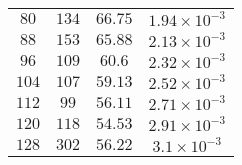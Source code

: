 \begin{center}
\begin{table}
\begin{center}
\begin{tabular}{c | c | c | c }
		$80$ & $134$ & $66.75$ & $1.94\times 10^{-3}$ \\ 
		$88$ & $153$ & $65.88$ & $2.13\times 10^{-3}$ \\ 
		$96$ & $109$ & $60.6$ & $2.32\times 10^{-3}$ \\ 
		$104$ & $107$ & $59.13$ & $2.52\times 10^{-3}$ \\ 
		$112$ & $99$ & $56.11$ & $2.71\times 10^{-3}$ \\ 
		$120$ & $118$ & $54.53$ & $2.91\times 10^{-3}$ \\ 
		$128$ & $302$ & $56.22$ & $3.1\times 10^{-3}$ \\  
		\hline  
	\end{tabular}
	\end{center}
\end{table}
\end{center}